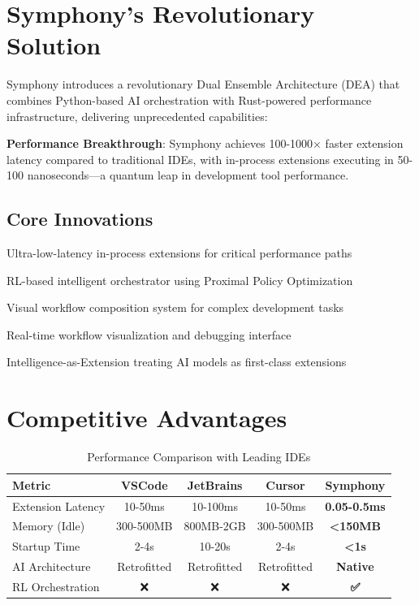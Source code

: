 \section*{Symphony's Revolutionary Solution}

Symphony introduces a revolutionary Dual Ensemble Architecture (DEA) that combines Python-based AI orchestration with Rust-powered performance infrastructure, delivering unprecedented capabilities:

\begin{successbox}
\textbf{Performance Breakthrough}: Symphony achieves 100-1000× faster extension latency compared to traditional IDEs, with in-process extensions executing in 50-100 nanoseconds—a quantum leap in development tool performance.
\end{successbox}

\subsection*{Core Innovations}

\begin{description}[leftmargin=4cm,labelwidth=3.5cm]
    \item[\textbf{The Pit}] Ultra-low-latency in-process extensions for critical performance paths
    \item[\textbf{The Conductor}] RL-based intelligent orchestrator using Proximal Policy Optimization
    \item[\textbf{Melodies}] Visual workflow composition system for complex development tasks
    \item[\textbf{Harmony Board}] Real-time workflow visualization and debugging interface
    \item[\textbf{IaE Model}] Intelligence-as-Extension treating AI models as first-class extensions
\end{description}

\section*{Competitive Advantages}

\begin{table}[ht]
\centering
\begin{tabular}{@{}lcccc@{}}
\toprule
\textbf{Metric} & \textbf{VSCode} & \textbf{JetBrains} & \textbf{Cursor} & \textbf{Symphony} \\
\midrule
Extension Latency & 10-50ms & 10-100ms & 10-50ms & \textbf{0.05-0.5ms} \\
Memory (Idle) & 300-500MB & 800MB-2GB & 300-500MB & \textbf{<150MB} \\
Startup Time & 2-4s & 10-20s & 2-4s & \textbf{<1s} \\
AI Architecture & Retrofitted & Retrofitted & Retrofitted & \textbf{Native} \\
RL Orchestration & ❌ & ❌ & ❌ & \textbf{✅} \\
\bottomrule
\end{tabular}
\caption{Performance Comparison with Leading IDEs}
\end{table}

